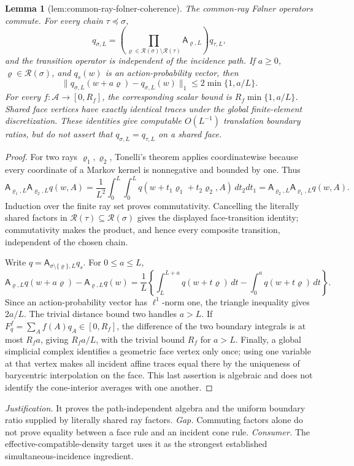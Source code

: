 \documentclass{article}
\newtheorem{lemma}{Lemma}
\begin{document}
\begin{lemma}[lem:common-ray-folner-coherence]\label{lem:common-ray-folner-coherence}
The common-ray Følner operators commute. For every chain \(\tau\preceq\sigma\),
\[
 q_{\sigma,L}
 =\left(\prod_{\varrho\in\mathscr R(\sigma)\setminus\mathscr R(\tau)}
 \mathsf A_{\varrho,L}\right)q_{\tau,L},
\]
and the transition operator is independent of the incidence path. If \(a\ge0\), \(\varrho\in\mathscr R(\sigma)\), and \(q_s(w)\) is an action-probability vector, then
\[
 \|q_{\sigma,L}(w+a\varrho)-q_{\sigma,L}(w)\|_1
 \le 2\min\{1,a/L\}.
\]
For every \(f:\mathcal A\to[0,R_f]\), the corresponding scalar bound is \(R_f\min\{1,a/L\}\). Shared face vertices have exactly identical traces under the global finite-element discretization. These identities give computable \(O(L^{-1})\) translation boundary ratios, but do not assert that \(q_{\sigma,L}=q_{\tau,L}\) on a shared face.
\end{lemma}
\begin{proof}
For two rays \(\varrho_1,\varrho_2\), Tonelli's theorem applies coordinatewise because every coordinate of a Markov kernel is nonnegative and bounded by one. Thus
\[
 \mathsf A_{\varrho_1,L}\mathsf A_{\varrho_2,L}q(w,A)
 =\frac1{L^2}\int_0^L\int_0^L
 q(w+t_1\varrho_1+t_2\varrho_2,A)\,dt_2dt_1
 =\mathsf A_{\varrho_2,L}\mathsf A_{\varrho_1,L}q(w,A).
\]
Induction over the finite ray set proves commutativity. Cancelling the literally shared factors in \(\mathscr R(\tau)\subseteq\mathscr R(\sigma)\) gives the displayed face-transition identity; commutativity makes the product, and hence every composite transition, independent of the chosen chain.

Write \(q=\mathsf A_{\sigma\setminus\{\varrho\},L}q_s\). For \(0\le a\le L\),
\[
 \mathsf A_{\varrho,L}q(w+a\varrho)-\mathsf A_{\varrho,L}q(w)
 =\frac1L\left\{\int_L^{L+a}q(w+t\varrho)\,dt-
 \int_0^aq(w+t\varrho)\,dt\right\}.
\]
Since an action-probability vector has \(\ell^1\)-norm one, the triangle inequality gives \(2a/L\). The trivial distance bound two handles \(a>L\). If \(F_q^f=\sum_Af(A)q_A\in[0,R_f]\), the difference of the two boundary integrals is at most \(R_fa\), giving \(R_fa/L\), with the trivial bound \(R_f\) for \(a>L\). Finally, a global simplicial complex identifies a geometric face vertex only once; using one variable at that vertex makes all incident affine traces equal there by the uniqueness of barycentric interpolation on the face. This last assertion is algebraic and does not identify the cone-interior averages with one another.
\end{proof}
\par\smallskip\noindent \textit{Justification.} It proves the path-independent algebra and the uniform boundary ratio supplied by literally shared ray factors. \textit{Gap.} Commuting factors alone do not prove equality between a face rule and an incident cone rule. \textit{Consumer.} The effective-compatible-density target uses it as the strongest established simultaneous-incidence ingredient.
\end{document}
